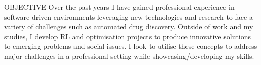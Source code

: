 
\begin{ResumeSection}{OBJECTIVE}
    Over the past years I have gained professional experience in software driven environments leveraging new technologies and research to face a variety of challenges such as automated drug discovery. Outside of work and my studies, I develop RL and optimisation projects to produce innovative solutions to emerging problems and social issues. I look to utilise these concepts to address major challenges in a professional setting while showcasing/developing my skills.
\end{ResumeSection}
